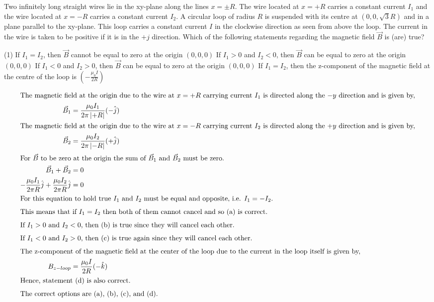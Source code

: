 
\item Two infinitely long straight wires lie in the xy-plane along the lines \( x = \pm R \). The wire located at \( x = +R \) carries a constant current \( I_1 \) and the wire located at \( x = -R \) carries a constant current \( I_2 \). A circular loop of radius \( R \) is suspended with its centre at \( (0,0,\sqrt{3}R) \) and in a plane parallel to the xy-plane. This loop carries a constant current \( I \) in the clockwise direction as seen from above the loop. The current in the wire is taken to be positive if it is in the \( +j \) direction. Which of the following statements regarding the magnetic field \( \vec{B} \) is (are) true?
    \begin{tasks}(1)
        \task If \( I_1 = I_2 \), then \( \vec{B} \) cannot be equal to zero at the origin \( (0,0,0) \)
        \task If \( I_1 > 0 \) and \( I_2 < 0 \), then \( \vec{B} \) can be equal to zero at the origin \( (0,0,0) \)
        \task If \( I_1 < 0 \) and \( I_2 > 0 \), then \( \vec{B} \) can be equal to zero at the origin \( (0,0,0) \)
        \task If \( I_1 = I_2 \), then the z-component of the magnetic field at the centre of the loop is \( \left(-\frac{\mu_0 I}{2R}\right) \)
    \end{tasks}
    \begin{solution}
        \begin{align*}
            \intertext{The magnetic field at the origin due to the wire at $x=+R$ carrying current $I_1$ is directed along the $-y$ direction and is given by,}
            \vec{B}_1 &= \frac{\mu_0 I_1}{2\pi \left|+R\right|} (-\hat{j})\\
            \intertext{The magnetic field at the origin due to the wire at $x=-R$ carrying current $I_2$ is directed along the $+y$ direction and is given by,}
            \vec{B}_2 &= \frac{\mu_0 I_2}{2\pi \left|-R\right|} (+\hat{j})\\
            \intertext{For $\vec{B}$ to be zero at the origin the sum of $\vec{B}_1$ and $\vec{B}_2$ must be zero.}
            \vec{B}_1 + \vec{B}_2 &= 0\\
            -\frac{\mu_0 I_1}{2\pi R}\hat{j} + \frac{\mu_0 I_2}{2\pi R}\hat{j} &= 0\\
            \intertext{For this equation to hold true $I_1$ and $I_2$ must be equal and opposite, i.e. $I_1 = -I_2$.}
            \intertext{This means that if $I_1 = I_2$ then both of them cannot cancel and so (a) is correct.}
            \intertext{If $I_1 > 0$ and $I_2 < 0$, then (b) is true since they will cancel each other.}
            \intertext{If $I_1 < 0$ and $I_2 > 0$, then (c) is true again since they will cancel each other.}
            \intertext{The z-component of the magnetic field at the center of the loop due to the current in the loop itself is given by,}
            B_{z-loop} &= \frac{\mu_0 I}{2 R} (-\hat{k})\\
            \intertext{Hence, statement (d) is also correct.}
        \intertext{The correct options are (a), (b), (c), and (d).}
        \end{align*}
    \end{solution}